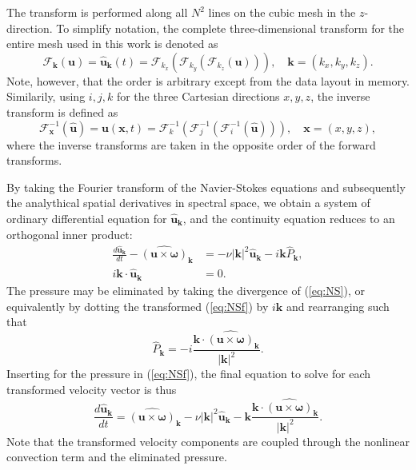 \documentclass[11pt, oneside]{article}
\begin{document}
The transform is performed along all $N^2$ lines on the cubic mesh in the $z$-direction. To simplify notation, the complete three-dimensional transform for the entire mesh used in this work is denoted as
\begin{equation}
\mathcal{F}_{\bm{k}}(\bm{u}) = \hat{\bm{u}}_{\bm{k}}(t) = \mathcal{F}_{k_x}\left(\mathcal{F}_{k_y}\left(\mathcal{F}_{k_z}(\bm{u})\right)\right), \quad \bm{k}=(k_x, k_y, k_z).
\end{equation}
Note, however, that the order is arbitrary except from the data layout in memory. Similarily, using $i,j,k$ for the three Cartesian directions $x,y,z$, the inverse transform is defined as
\begin{equation}
\mathcal{F}^{-1}_{\bm{x}}(\hat{\bm{u}}) = \bm{u}(\bm{x}, t) = \mathcal{F}^{-1}_{k}\left(\mathcal{F}^{-1}_{j}\left(\mathcal{F}^{-1}_{i}(\hat{\bm{u}})\right)\right), \quad \bm{x} = (x, y, z),
\end{equation}
where the inverse transforms are taken in the opposite order of the forward transforms.

By taking the Fourier transform of the Navier-Stokes equations and subsequently the analythical spatial derivatives in spectral space, we obtain a system of ordinary differential equation for $\hat{\bm{u}}_{\bm{k}}$, and the continuity equation reduces to an orthogonal inner product:
\begin{align}
 \frac{d\hat{\bm{u}}_{\bm{k}}}{d t} - \widehat{( \bm{u} \times \bm{\omega})}_{\bm{k}} &= - \nu |\bm{k}|^2  \hat{\bm{u}}_{\bm{k}} - i \bm{k} \hat{P}_{\bm{k}}, \label{eq:NSf} \\
 i \bm{k} \cdot \hat{\bm{u}}_{\bm{k}} &= 0.
\end{align}
The pressure may be eliminated by taking the divergence of (\ref{eq:NS}), or equivalently by dotting the transformed (\ref{eq:NSf}) by $i \bm{k}$ and rearranging such that
\begin{equation}
\hat{P}_{\bm{k}} = -i \frac{\bm{k} \cdot \widehat{( \bm{u} \times \bm{\omega})}_{\bm{k}} }{|\bm{k}|^2}.
\end{equation}
Inserting for the pressure in (\ref{eq:NSf}), the final equation to solve for each transformed velocity vector is thus
\begin{equation}
 \frac{d\hat{\bm{u}}_{\bm{k}}}{d t}  = \widehat{( \bm{u} \times \bm{\omega})}_{\bm{k}} - \nu |\bm{k}|^2  \hat{\bm{u}}_{\bm{k}} - \bm{k} \frac{\bm{k} \cdot \widehat{( \bm{u} \times \bm{\omega})}_{\bm{k}} }{|\bm{k}|^2}. \label{eq:NSfinal}
\end{equation}
Note that the transformed velocity components are coupled through the nonlinear convection term and the eliminated pressure.
\end{document}
